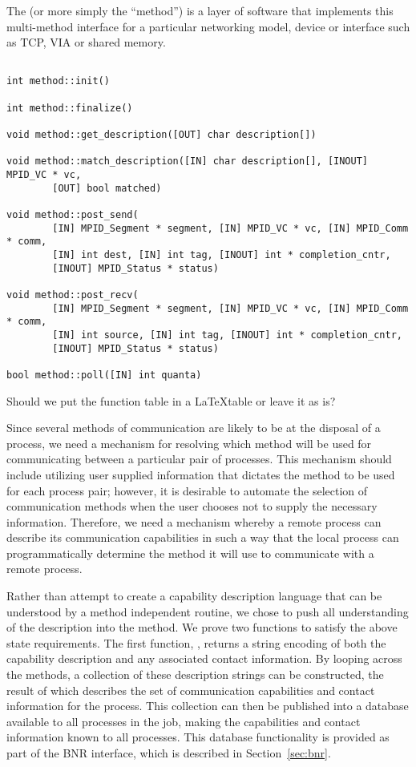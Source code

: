 The  (or more simply the ``method'') is a layer of
software that implements this multi-method interface for a particular
networking model, device or interface such as TCP, VIA or shared memory.

\begin{verbatim}

int method::init()

int method::finalize()

void method::get_description([OUT] char description[])

void method::match_description([IN] char description[], [INOUT] MPID_VC * vc,
        [OUT] bool matched)

void method::post_send(
        [IN] MPID_Segment * segment, [IN] MPID_VC * vc, [IN] MPID_Comm * comm,
        [IN] int dest, [IN] int tag, [INOUT] int * completion_cntr,
        [INOUT] MPID_Status * status)

void method::post_recv(
        [IN] MPID_Segment * segment, [IN] MPID_VC * vc, [IN] MPID_Comm * comm,
        [IN] int source, [IN] int tag, [INOUT] int * completion_cntr,
        [INOUT] MPID_Status * status)

bool method::poll([IN] int quanta)
\end{verbatim}

\begin{cmt}[BRT]
Should we put the function table in a \LaTeX table or leave it as is?
\end{cmt}

Since several methods of communication are likely to be at the disposal of a
process, we need a mechanism for resolving which method will be used for
communicating between a particular pair of processes.  This mechanism should
include utilizing user supplied information that dictates the method to be used
for each process pair; however, it is desirable to automate the selection of
communication methods when the user chooses not to supply the necessary
information.  Therefore, we need a mechanism whereby a remote process can
describe its communication capabilities in such a way that the local process
can programmatically determine the method it will use to communicate with a
remote process.

Rather than attempt to create a capability description language that can be
understood by a method independent routine, we chose to push all understanding
of the description into the method.  We prove two functions to satisfy the
above state requirements.  The first function, ,
returns a string encoding of both the capability description and any associated
contact information.  By looping across the methods, a collection of these
description strings can be constructed, the result of which describes the set
of communication capabilities and contact information for the process.  This
collection can then be published into a database available to all processes in
the job, making the capabilities and contact information known to all
processes.  This database functionality is provided as part of the BNR
interface, which is described in Section~\ref{sec:bnr}.

